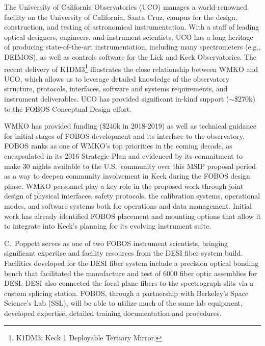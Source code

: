 \documentclass[oneside,11pt]{amsart}
\begin{document}
\medskip
{}  The University of California Observatories (UCO) manages a
world-renowned facility on the University of California, Santa Cruz, campus for the design, construction, and testing
of astronomical instrumentation.  With a staff of leading optical designers, engineers, and instrument scientists, UCO
has a long heritage of producing state-of-the-art instrumentation, including many spectrometers (e.g., DEIMOS), as well
as controls software for the Lick and Keck Observatories.  The recent delivery of K1DM3\footnote{K1DM3: Keck 1
Deployable Tertiary Mirror.} illustrates the close relationship between WMKO and UCO, which allows us to leverage
detailed knowledge of the observatory structure, protocols, interfaces, software and systems requirements, and
instrument deliverables.  UCO has provided significant in-kind support ($\sim$\$270k) to the FOBOS Conceptual Design effort.

 WMKO has provided funding (\$240k in 2018-2019) as well as technical guidance for initial stages of FOBOS development and its interface to
the observatory.  FOBOS ranks as one of WMKO's top priorities in the coming decade, as encapsulated in its 2016
Strategic Plan and evidenced by its commitment to make 30 nights available to the U.S.\ community over this MSIP
proposal period as a way to deepen community involvement in Keck during the FOBOS design phase. WMKO personnel play a
key role in the proposed work through joint design of physical interfaces, safety protocols, the calibration systems,
operational modes, and software systems both for operations and data management.  Initial work has already identified
FOBOS placement and mounting options that allow it to integrate into Keck's planning for its evolving instrument suite.

 C.~Poppett serves as one of two FOBOS instrument scientists,
bringing significant expertise and facility resources from the DESI fiber system build.  Facilities developed for the
DESI fiber system include a precision optical bonding bench that facilitated the manufacture and test of 6000 fiber
optic assemblies for DESI. DESI also connected the focal plane fibers to the spectrograph slits via a custom splicing
station.  FOBOS, through a partnership with Berkeley's Space Science's Lab (SSL), will be able to utilize much of the
same lab equipment, developed expertise, detailed training documentation and procedures.
\end{document}
